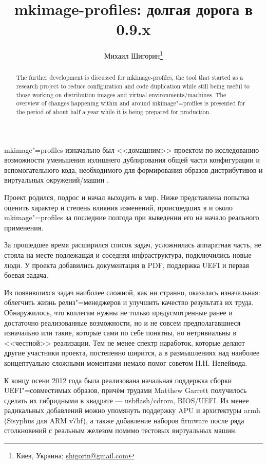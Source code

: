 \documentclass[10pt, a5paper]{article}
\begin{document}
\title{mkimage-profiles: долгая дорога в 0.9.x}%

\author{Михаил Шигорин\footnote{Киев, Украина; \url{shigorin@gmail.com}}}
\maketitle

\begin{abstract}
The further development is discussed for mkimage-profiles, the tool that started as a research project to reduce configuration and code duplication while still being useful to those working on distribution images and virtual environments/machines. The overview of changes happening within and around mkimage"=profiles is presented for the period of about half a year while it is being prepared for production.
\end{abstract}

mkimage"=profiles изначально был <<домашним>> проектом по исследованию возможности уменьшения излишнего дублирования общей части конфигурации и вспомогательного кода, необходимого для формирования образов дистрибутивов и виртуальных окружений/машин \cite{Shigorinw1}.

Проект родился, подрос и начал выходить в мир. Ниже представлена попытка оценить характер и степень влияния изменений, происшедших в и около mkimage"=profiles за последние полгода при выведении его на начало реального применения.

За прошедшее время расширился список задач, усложнилась аппаратная часть, не стояла на месте подлежащая и соседняя инфраструктура, подключились новые люди. У проекта добавились документация в PDF, поддержка UEFI и первая боевая задача.

Из появившихся задач наиболее сложной, как ни странно, оказалась изначальная: облегчить жизнь релиз"=менеджеров и улучшить качество результата их труда. Обнаружилось, что коллегам нужны не только предусмотренные ранее и достаточно реализованные возможности, но и не совсем предполагавшиеся изначально или такие, которые сами по себе понятны, но нетривиальны в <<честной>> реализации.  Тем не менее спектр наработок, которые делают другие участники проекта, постепенно ширится, а в размышлениях над наиболее концептуально сложными моментами немало помог советом Н.Н. Непейвода.

К концу осени 2012 года была реализована начальная поддержка сборки UEFI"=совместимых образов, причём трудами Matthew Garrett получилось сделать их гибридными в квадрате --- usbflash/cdrom, BIOS/UEFI.  Из менее радикальных добавлений можно упомянуть поддержку APU и архитектуры armh (Sisyphus для ARM v7hf), а также добавление наборов firmware после ряда столкновений с реальным железом помимо тестовых виртуальных машин.
\end{document}
